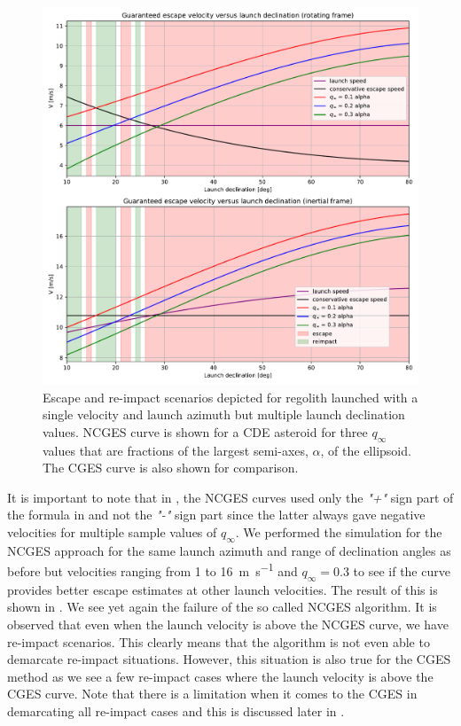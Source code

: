 \begin{figure}[!h]
\centering
\captionsetup{justification=centering}
\includegraphics[width=\textwidth, height=0.5\textheight, keepaspectratio=true]{non_conservative_escape_speed/multiple_qinfinity_plus.pdf}
\caption{Escape and re-impact scenarios depicted for regolith launched with a single velocity and launch azimuth but multiple launch declination values. \gls{NCGES} curve is shown for a \gls{CDE} asteroid for three $q_\infty$ values that are fractions of the largest semi-axes, $\alpha$, of the ellipsoid. The \gls{CGES} curve is also shown for comparison.}
\label{fig:non_conservative_escape_multiple_qinfinity_single_velocity}
\end{figure}
\FloatBarrier
It is important to note that in , the \gls{NCGES} curves used only the \emph{"+"} sign part of the formula in  and not the \emph{"-"} sign part since the latter always gave negative velocities for multiple sample values of $q_\infty$. We performed the simulation for the \gls{NCGES} approach for the same launch azimuth and range of declination angles as before but velocities ranging from 1 to \SI{16}{\metre\per\second} and $q_\infty=0.3$ to see if the curve provides better escape estimates at other launch velocities. The result of this is shown in . We see yet again the failure of the so called \gls{NCGES} algorithm. It is observed that even when the launch velocity is above the \gls{NCGES} curve, we have re-impact scenarios. This clearly means that the algorithm is not even able to demarcate re-impact situations. However, this situation is also true for the \gls{CGES} method as we see a few re-impact cases where the launch velocity is above the \gls{CGES} curve. Note that there is a limitation when it comes to the \gls{CGES} in demarcating all re-impact cases and this is discussed later in .

